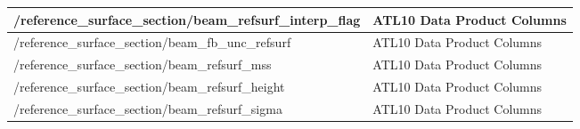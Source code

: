 \begin{table}[htbp]
\begin{tabularx}{\textwidth} {|X|X|}
   \hline
   /reference\_surface\_section/beam\_refsurf\_interp\_flag & ATL10 Data Product Columns \\ 
   \hline
   /reference\_surface\_section/beam\_fb\_unc\_refsurf & ATL10 Data Product Columns \\ 
   \hline
   /reference\_surface\_section/beam\_refsurf\_mss & ATL10 Data Product Columns \\ 
   \hline
   /reference\_surface\_section/beam\_refsurf\_height & ATL10 Data Product Columns \\ 
   \hline
   /reference\_surface\_section/beam\_refsurf\_sigma & ATL10 Data Product Columns \\ 
   \hline
  \end{tabularx}
\end{table}
